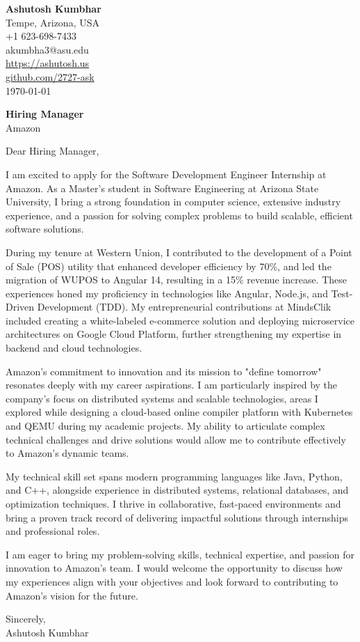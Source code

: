 \documentclass[11pt]{article}
\begin{document}
\begin{flushleft}
\textbf{Ashutosh Kumbhar} \\
Tempe, Arizona, USA \\
+1 623-698-7433 \\
akumbha3@asu.edu \\
\url{https://ashutosh.us} \\
\url{github.com/2727-ask} \\
\today
\end{flushleft}

\vspace{0.5em}

\textbf{Hiring Manager} \\
Amazon \\

\vspace{1em}

Dear Hiring Manager,

I am excited to apply for the Software Development Engineer Internship at Amazon. As a Master's student in Software Engineering at Arizona State University, I bring a strong foundation in computer science, extensive industry experience, and a passion for solving complex problems to build scalable, efficient software solutions.

During my tenure at Western Union, I contributed to the development of a Point of Sale (POS) utility that enhanced developer efficiency by 70\%, and led the migration of WUPOS to Angular 14, resulting in a 15\% revenue increase. These experiences honed my proficiency in technologies like Angular, Node.js, and Test-Driven Development (TDD). My entrepreneurial contributions at MindsClik included creating a white-labeled e-commerce solution and deploying microservice architectures on Google Cloud Platform, further strengthening my expertise in backend and cloud technologies.

Amazon's commitment to innovation and its mission to "define tomorrow" resonates deeply with my career aspirations. I am particularly inspired by the company's focus on distributed systems and scalable technologies, areas I explored while designing a cloud-based online compiler platform with Kubernetes and QEMU during my academic projects. My ability to articulate complex technical challenges and drive solutions would allow me to contribute effectively to Amazon's dynamic teams.

My technical skill set spans modern programming languages like Java, Python, and C++, alongside experience in distributed systems, relational databases, and optimization techniques. I thrive in collaborative, fast-paced environments and bring a proven track record of delivering impactful solutions through internships and professional roles.

I am eager to bring my problem-solving skills, technical expertise, and passion for innovation to Amazon's team. I would welcome the opportunity to discuss how my experiences align with your objectives and look forward to contributing to Amazon’s vision for the future.

Sincerely, \\
Ashutosh Kumbhar
\end{document}
